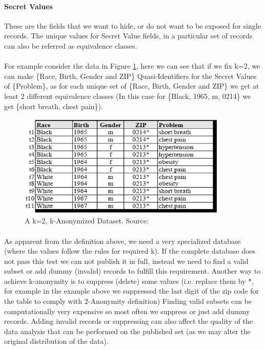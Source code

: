\documentclass[12pt]{report}
\begin{document}
\paragraph{Secret Values}
These are the fields that we want to hide, or do not want to be exposed for single records. The unique values for Secret Value fields, in a particular set of records can also be referred as equivalence classes.

\paragraph{}
For example consider the data in Figure \ref{fig:kAon=2}, here we can see that if we fix k=2, we can make \{Race, Birth, Gender and ZIP\} Quasi-Identifiers for the Secret Values of \{Problem\}, as for each unique set of \{Race, Birth, Gender and ZIP\} we get at least 2 different equivalence classes (In this case for \{Black, 1965, m, 0214\} we get \{short breath, chest pain\}).
\begin{figure}[ht]
\centering
        \includegraphics[width=100mm,scale=0.5]{Images/k2Diversified.png}
    \caption{A k=2, k-Anonymized Dataset. Source:\cite{sweeney2002k}}
    \label{fig:kAon=2}
\end{figure}

\paragraph{}
As apparent from the definition above, we need a very specialized database (where the values follow the rules for required k). If the complete database does not pass this test we can not publish it in full, instead we need to find a valid subset or add dummy (invalid) records to fulfill this requirement. Another way to achieve k-anonymity is to suppress (delete) some values (i.e. replace them by *, for example in the example above we suppressed the last digit of the zip code for the table to comply with 2-Anonymity definition) Finding valid subsets can be computationally very expensive so most often we suppress or just add dummy records. Adding invalid records or suppressing can also affect the quality of the data analysis that can be performed on the published set (as we may alter the original distribution of the data).
\end{document}
